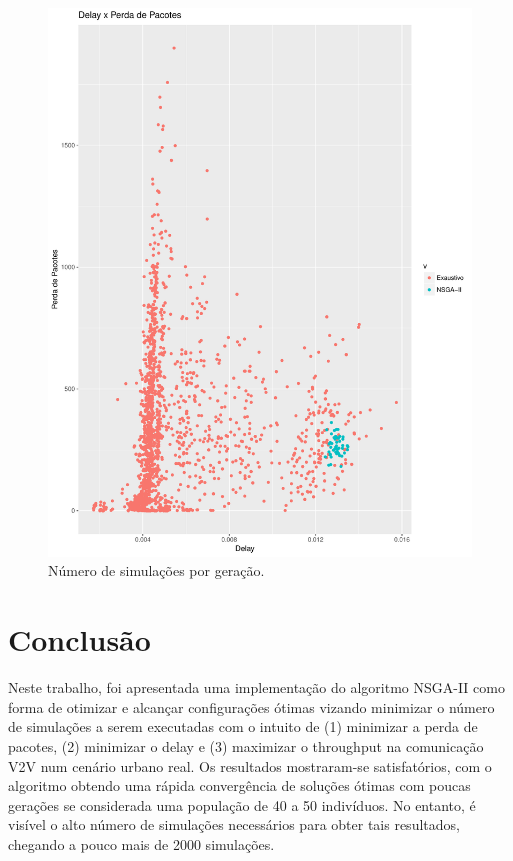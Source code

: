 \documentclass[conference]{IEEEtran}
\begin{document}
\begin{figure}[h]
  \centering
  \includegraphics[scale=0.30]{figures/ExaustivoXNsgaii_DelayXPerdaPacotes.pdf}
  \caption{Número de simulações por geração.}
  \label{fig:result-sim}
\end{figure}



\section{Conclusão}

Neste trabalho, foi apresentada uma implementação do algoritmo NSGA-II
como forma de otimizar e alcançar configurações ótimas vizando
minimizar o número de simulações a serem executadas com o intuito de
(1) minimizar a perda de pacotes, (2) minimizar o delay e (3)
maximizar o throughput na comunicação V2V num cenário urbano real.  Os
resultados mostraram-se satisfatórios, com o algoritmo obtendo uma
rápida convergência de soluções ótimas com poucas gerações se
considerada uma população de 40 a 50 indivíduos. No entanto, é visível
o alto número de simulações necessários para obter tais resultados,
chegando a pouco mais de 2000 simulações.


\nocite{*} %

%
%

\end{document}
